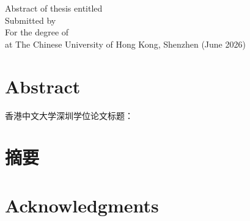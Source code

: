 \documentclass[12pt,a4paper]{report}
\begin{document}

\clearpage
{\noindent 
Abstract of thesis entitled  \\
Submitted by  \\
For the degree of  \\
at The Chinese University of Hong Kong, Shenzhen (June 2026) \\
}
{
\makeatletter
\renewcommand{\clearpage}{} 
\renewcommand{\cleardoublepage}{}
\makeatother

\chapter*{Abstract}

\lipsum[1]

}






\clearpage
{\noindent 
    香港中文大学深圳学位论文标题：\\
}
{
\makeatletter
\renewcommand{\clearpage}{} 
\renewcommand{\cleardoublepage}{}
\makeatother

\chapter*{摘要}

\lipsum[1]

}







\clearpage
\chapter*{Acknowledgments}

\lipsum[1]



\clearpage
\end{document}
